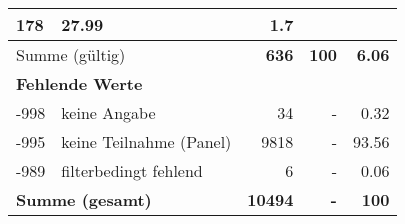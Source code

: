 \begin{longtable}{lXrrr}
       \num{178} &
       \num[round-mode=places,round-precision=2]{27,99} &
         \num[round-mode=places,round-precision=2]{1,7} \\
     \midrule
     \multicolumn{2}{l}{Summe (gültig)} &
       \textbf{\num{636}} &
     \textbf{100} &
       \textbf{\num[round-mode=places,round-precision=2]{6,06}} \\
     \multicolumn{5}{l}{\textbf{Fehlende Werte}}\\
       -998 &
       keine Angabe &
         \num{34} &
        - &
         \num[round-mode=places,round-precision=2]{0,32} \\
       -995 &
       keine Teilnahme (Panel) &
         \num{9818} &
        - &
         \num[round-mode=places,round-precision=2]{93,56} \\
       -989 &
       filterbedingt fehlend &
         \num{6} &
        - &
         \num[round-mode=places,round-precision=2]{0,06} \\
     \midrule
     \multicolumn{2}{l}{\textbf{Summe (gesamt)}} &
          \textbf{\num{10494}} &
        \textbf{-} &
        \textbf{100} \\
     \bottomrule
     \end{longtable}
     
